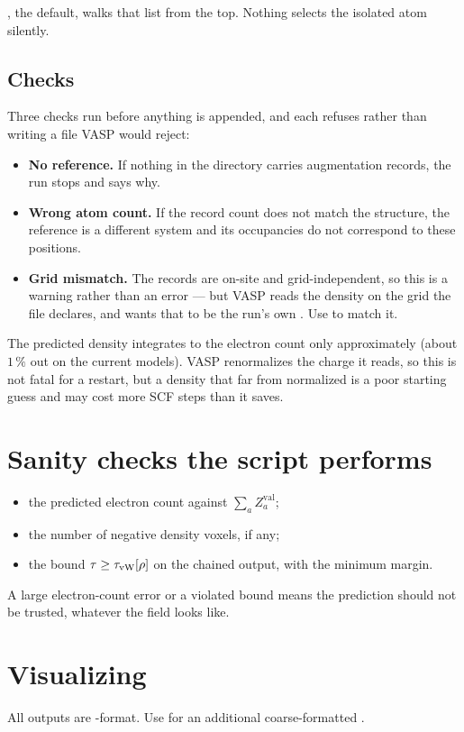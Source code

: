 , the default, walks that list from the top. Nothing
selects the isolated atom silently.

\subsection{Checks}

Three checks run before anything is appended, and each refuses rather than
writing a file VASP would reject:

\begin{itemize}
  \item \textbf{No reference.} If nothing in the directory carries
        augmentation records, the run stops and says why.
  \item \textbf{Wrong atom count.} If the record count does not match the
        structure, the reference is a different system and its occupancies do
        not correspond to these positions.
  \item \textbf{Grid mismatch.} The records are on-site and grid-independent,
        so this is a warning rather than an error --- but VASP reads the
        density on the grid the file declares, and  wants that
        to be the run's own . Use  to match it.
\end{itemize}

\begin{pnote}
The predicted density integrates to the electron count only approximately
(about $1\,\%$ out on the current models). VASP renormalizes the charge it
reads, so this is not fatal for a restart, but a density that far from
normalized is a poor starting guess and may cost more SCF steps than it saves.
\end{pnote}

\section{Sanity checks the script performs}

\begin{itemize}
  \item the predicted electron count against $\sum_a Z^{\mathrm{val}}_a$;
  \item the number of negative density voxels, if any;
  \item the bound $\tau \ge \tau_{\rm vW}[\rho]$ on the chained output, with the
    minimum margin.
\end{itemize}

A large electron-count error or a violated bound means the prediction should
not be trusted, whatever the field looks like.

\section{Visualizing}

All outputs are -format. Use
 for an additional coarse-formatted .
